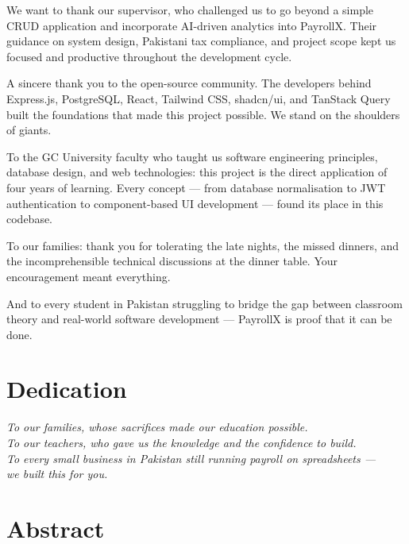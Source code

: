 \documentclass[12pt,a4paper]{report}
\begin{document}
We want to thank our supervisor, who challenged us to go beyond a simple CRUD application and incorporate AI-driven analytics into PayrollX. Their guidance on system design, Pakistani tax compliance, and project scope kept us focused and productive throughout the development cycle.

A sincere thank you to the open-source community. The developers behind Express.js, PostgreSQL, React, Tailwind CSS, shadcn/ui, and TanStack Query built the foundations that made this project possible. We stand on the shoulders of giants.

To the GC University faculty who taught us software engineering principles, database design, and web technologies: this project is the direct application of four years of learning. Every concept --- from database normalisation to JWT authentication to component-based UI development --- found its place in this codebase.

To our families: thank you for tolerating the late nights, the missed dinners, and the incomprehensible technical discussions at the dinner table. Your encouragement meant everything.

And to every student in Pakistan struggling to bridge the gap between classroom theory and real-world software development --- PayrollX is proof that it can be done.

\chapter*{Dedication}

\vspace*{3cm}
\begin{center}
\textit{To our families, whose sacrifices made our education possible.\\
To our teachers, who gave us the knowledge and the confidence to build.\\
To every small business in Pakistan still running payroll on spreadsheets ---\\
we built this for you.}
\end{center}

\chapter*{Abstract}
\end{document}
